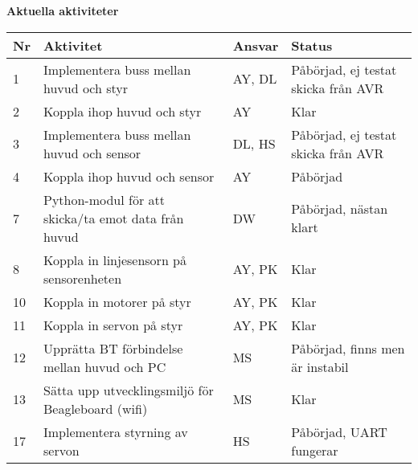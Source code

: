 \documentclass[titlepage, a4paper]{article}
\begin{document}
\newpage
\textbf{\Large Aktuella aktiviteter}
\begin{center}
\begin{tabularx}{\textwidth}{| p{4mm} | X | p{13.5mm} | X |}
	\hline
	\textbf{Nr} & \textbf{Aktivitet} & \textbf{Ansvar} & \textbf{Status} \\\hline
	{1} & {Implementera buss mellan huvud och styr} & {AY, DL} & {Påbörjad, ej testat skicka från AVR} \\\hline
	{2} & {Koppla ihop huvud och styr} & {AY} & {Klar} \\\hline
	{3} & {Implementera buss mellan huvud och sensor} & {DL, HS} & {Påbörjad, ej testat skicka från AVR} \\\hline
	{4} & {Koppla ihop huvud och sensor} & {AY} & {Påbörjad} \\\hline
	{7} & {Python-modul för att skicka/ta emot data från huvud} & {DW} & {Påbörjad, nästan klart} \\\hline
	{8} & {Koppla in linjesensorn på sensorenheten} & {AY, PK} & {Klar} \\\hline
	{10} & {Koppla in motorer på styr} & {AY, PK} & {Klar} \\\hline
	{11} & {Koppla in servon på styr} & {AY, PK} & {Klar} \\\hline
	{12} & {Upprätta BT förbindelse mellan huvud och PC} & {MS} & {Påbörjad, finns men är instabil} \\\hline
	{13} & {Sätta upp utvecklingsmiljö för Beagleboard (wifi)} & {MS} & {Klar} \\\hline
	{17} & {Implementera styrning av servon} & {HS} & {Påbörjad, UART fungerar} \\\hline
\end{tabularx}
\end{center}
\end{document}
